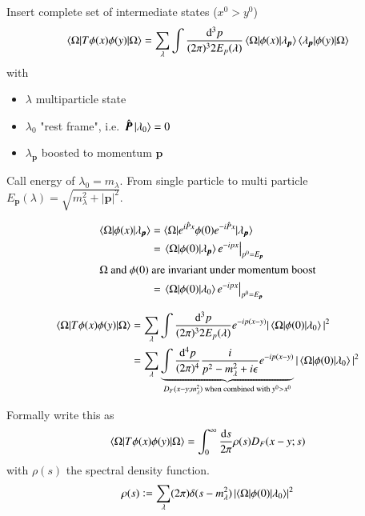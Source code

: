 Insert complete set of intermediate states ($x^0 > y^0$)
\begin{align*}
	\braket{\Omega | T\phi(x)\phi(y) | \Omega} = \sum_\lambda \int \frac{\dd^3 p}{(2\pi)^3 2E_p(\lambda)} \braket{\Omega | \phi(x) | \lambda_{\pmb{p}}} \braket{\lambda_{\pmb{p}} | \phi(y) | \Omega}
\end{align*}
with
\begin{itemize}[label={}]
	\item $\lambda$ multiparticle state
	\item $\lambda_0$ "rest frame", i.e.~$\hat{\pmb{P}}\ket{\lambda_0} = 0$
	\item $\lambda_{\pmb{p}}$ boosted to momentum $\pmb{p}$
\end{itemize}

Call energy of $\lambda_0 = m_\lambda$. From single particle to multi particle $E_{\pmb{p}}(\lambda) = \sqrt{m^2_\lambda + |\pmb{p}|^2}$.

\begin{align*}
	\braket{\Omega | \phi(x) | \lambda_{\pmb{p}}} &= \braket{\Omega| e^{i\hat{P}x} \phi(0) e^{-i\hat{P}x}|\lambda_{\pmb{p}}}	\\
									   &= \left. \braket{\Omega| \phi(0) | \lambda_{\pmb{p}}} e^{-ipx} \right\rvert_{p^0 = E_{\pmb{p}}} \\
									   \shortintertext{$\Omega$ and $\phi(0)$ are invariant under momentum boost}
									   &= \left. \braket{\Omega| \phi(0) | \lambda_{0}} e^{-ipx} \right\rvert_{p^0 = E_{\pmb{p}}} \\
\end{align*}

\begin{align}
	\braket{\Omega | T\phi(x)\phi(y) | \Omega} &= \sum_\lambda \int \frac{\dd^3 p}{(2\pi)^3 2E_p(\lambda)} e^{-ip(x-y)} |\braket{\Omega| \phi(0) | \lambda_0 }|^2 \\
											   &= \sum_\lambda \underbrace{\int \frac{\dd^4 p}{(2\pi)^4} \frac{i}{p^2 - m^2_\lambda + i\epsilon} e^{-ip(x-y)}}_{D_F(x-y;m^2_\lambda) \text{ when combined with } y^0 > x^0} |\braket{\Omega| \phi(0) | \lambda_0 }|^2 \\ 
\end{align}

Formally write this as 
\begin{align}
	\braket{\Omega | T\phi(x)\phi(y) | \Omega} = \int^\infty_0 \frac{\dd s}{2\pi} \rho(s) D_F(x-y;s)
\end{align}
with $\rho(s)$ the spectral density function.
\begin{align}
	\rho(s) \vcentcolon = \sum_\lambda (2\pi) \delta(s - m_\lambda^2) \left| \braket{\Omega | \phi(0) | \lambda_0} \right|^2
\end{align}

